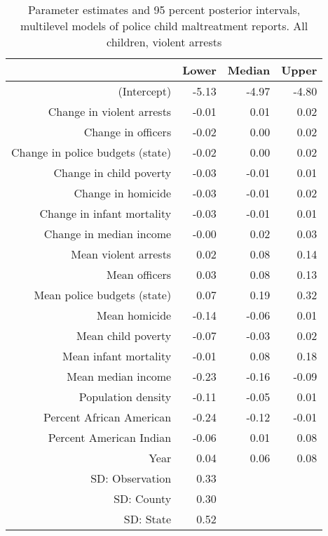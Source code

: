 \begin{table}[ht]
\centering
\begin{tabular}{rrrr}
  \hline
 & Lower & Median & Upper \\ 
  \hline
(Intercept) & -5.13 & -4.97 & -4.80 \\ 
  Change in violent arrests & -0.01 & 0.01 & 0.02 \\ 
  Change in officers & -0.02 & 0.00 & 0.02 \\ 
  Change in police budgets (state) & -0.02 & 0.00 & 0.02 \\ 
  Change in child poverty & -0.03 & -0.01 & 0.01 \\ 
  Change in homicide & -0.03 & -0.01 & 0.02 \\ 
  Change in infant mortality & -0.03 & -0.01 & 0.01 \\ 
  Change in median income & -0.00 & 0.02 & 0.03 \\ 
  Mean violent arrests & 0.02 & 0.08 & 0.14 \\ 
  Mean officers & 0.03 & 0.08 & 0.13 \\ 
  Mean police budgets (state) & 0.07 & 0.19 & 0.32 \\ 
  Mean homicide & -0.14 & -0.06 & 0.01 \\ 
  Mean child poverty & -0.07 & -0.03 & 0.02 \\ 
  Mean infant mortality & -0.01 & 0.08 & 0.18 \\ 
  Mean median income & -0.23 & -0.16 & -0.09 \\ 
  Population density & -0.11 & -0.05 & 0.01 \\ 
  Percent African American & -0.24 & -0.12 & -0.01 \\ 
  Percent American Indian & -0.06 & 0.01 & 0.08 \\ 
  Year & 0.04 & 0.06 & 0.08 \\ 
  SD: Observation & 0.33 &  &  \\ 
  SD: County & 0.30 &  &  \\ 
  SD: State & 0.52 &  &  \\ 
   \hline
\end{tabular}
\caption{Parameter estimates and 95 percent posterior intervals, multilevel models of 
             police child maltreatment reports. All children, violent arrests} 
\end{table}
